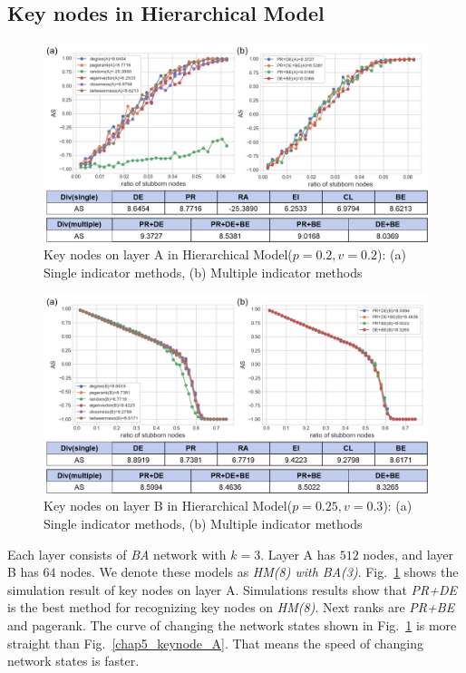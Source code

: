 \subsection{Key nodes in Hierarchical Model}
\begin{figure}[!htb]
	\centering
	\includegraphics[width=\hsize]{figure/chap5_keynode_HM_A.png}
	\caption{Key nodes on layer A in Hierarchical Model($p=0.2, v=0.2$):
		(a) Single indicator methods, (b) Multiple indicator methods}
	\label{chap5_keynode_HM_A}
\end{figure}
\begin{figure}[!htb]
	\centering
	\includegraphics[width=\hsize]{figure/chap5_keynode_HM_B.png}
	\caption{Key nodes on layer B in Hierarchical Model($p=0.25, v=0.3$):
		(a) Single indicator methods, (b) Multiple indicator methods}
	\label{chap5_keynode_HM_B}
\end{figure}
Each layer consists of \textit{BA} network with $k=3$. Layer A has $512$ nodes, and layer B has $64$ nodes. We denote these models as \textit{HM(8) with BA(3)}.
Fig.~\ref{chap5_keynode_HM_A} shows the simulation result of key nodes on layer A. Simulations results show that \textit{PR+DE} is the best method for recognizing key nodes on \textit{HM(8)}. Next ranks are \textit{PR+BE} and pagerank. The curve of changing the network states shown in Fig.~\ref{chap5_keynode_HM_A} is more straight than Fig.~\ref{chap5_keynode_A}. That means the speed of changing network states is faster. \\
